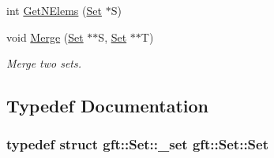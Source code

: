 \begin{DoxyCompactItemize}
\item 
int \hyperlink{namespacegft_1_1Set_a025fdd436883a58ae727e6bdced957e7}{Get\-N\-Elems} (\hyperlink{namespacegft_1_1Set_a82cadd31ebabd3c72c7f099c4980f45b}{Set} $\ast$S)
\item 
void \hyperlink{namespacegft_1_1Set_a51658fb40425e94ecc2624f45d5e9b0c}{Merge} (\hyperlink{namespacegft_1_1Set_a82cadd31ebabd3c72c7f099c4980f45b}{Set} $\ast$$\ast$S, \hyperlink{namespacegft_1_1Set_a82cadd31ebabd3c72c7f099c4980f45b}{Set} $\ast$$\ast$T)
\begin{DoxyCompactList}\small\item\em Merge two sets. \end{DoxyCompactList}\end{DoxyCompactItemize}


\subsection{Typedef Documentation}
\hypertarget{namespacegft_1_1Set_a82cadd31ebabd3c72c7f099c4980f45b}{
\subsubsection[{Set}]{\setlength{\rightskip}{0pt plus 5cm}typedef struct {\bf gft\-::\-Set\-::\-\_\-set}  {\bf gft\-::\-Set\-::\-Set}}}\label{namespacegft_1_1Set_a82cadd31ebabd3c72c7f099c4980f45b}


